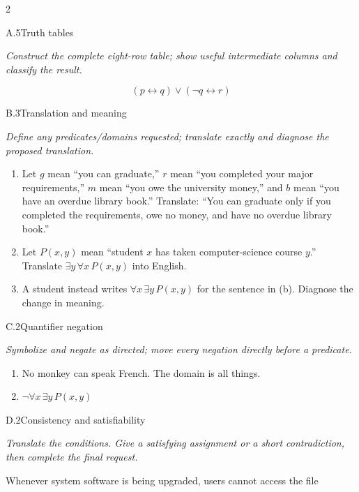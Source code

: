 \documentclass[9pt]{extarticle}
\begin{document}
\CoreWorkArea
\FormBreak
{}
\begin{multicols}{2}
\begin{CoreProblem}{A.5}{Truth tables}
{\scriptsize\textit{Construct the complete eight-row table; show useful intermediate columns and classify the result.}\par}
\[
  (p\leftrightarrow q)\lor(\neg q\leftrightarrow r)
\]
\end{CoreProblem}
\begin{CoreProblem}{B.3}{Translation and meaning}
{\scriptsize\textit{Define any predicates/domains requested; translate exactly and diagnose the proposed translation.}\par}
\begin{enumerate}[label=(\alph*)]
  \item Let $g$ mean ``you can graduate,'' $r$ mean ``you completed your major
        requirements,'' $m$ mean ``you owe the university money,'' and $b$
        mean ``you have an overdue library book.'' Translate: ``You can
        graduate only if you completed the requirements, owe no money, and
        have no overdue library book.''
  \item Let $P(x,y)$ mean ``student $x$ has taken computer-science course
        $y$.'' Translate $\exists y\,\forall x\,P(x,y)$ into English.
  \item A student instead writes $\forall x\,\exists y\,P(x,y)$ for the
        sentence in (b). Diagnose the change in meaning.
\end{enumerate}
\end{CoreProblem}
\begin{CoreProblem}{C.2}{Quantifier negation}
{\scriptsize\textit{Symbolize and negate as directed; move every negation directly before a predicate.}\par}
\begin{enumerate}[label=(\alph*)]
  \item No monkey can speak French. The domain is all things.
  \item $\neg\forall x\,\exists y\,P(x,y)$
\end{enumerate}
\end{CoreProblem}
\columnbreak
\begin{CoreProblem}{D.2}{Consistency and satisfiability}
{\scriptsize\textit{Translate the conditions. Give a satisfying assignment or a short contradiction, then complete the final request.}\par}
Whenever system software is being upgraded, users cannot access the file

\end{CoreProblem}
\end{multicols}
\end{document}
